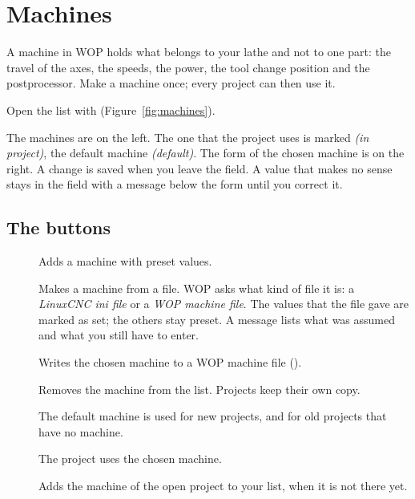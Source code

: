 \chapter{Machines}\label{ch:machines}

A machine in WOP holds what belongs to your lathe and not to one part: the travel of the axes, the speeds, the power, the tool change position and the postprocessor. Make a machine once; every project can then use it.

Open the list with  (Figure~\ref{fig:machines}).


The machines are on the left. The one that the project uses is marked \emph{(in project)}, the default machine \emph{(default)}. The form of the chosen machine is on the right. A change is saved when you leave the field. A value that makes no sense stays in the field with a message below the form until you correct it.

\section{The buttons}
\begin{description}
\item[] Adds a machine with preset values.
\item[] Makes a machine from a file. WOP asks what kind of file it is: a \emph{LinuxCNC ini file} or a \emph{WOP machine file}. The values that the file gave are marked as set; the others stay preset. A message lists what was assumed and what you still have to enter.
\item[] Writes the chosen machine to a WOP machine file ().
\item[] Removes the machine from the list. Projects keep their own copy.
\item[] The default machine is used for new projects, and for old projects that have no machine.
\item[] The project uses the chosen machine.
\item[] Adds the machine of the open project to your list, when it is not there yet.
\end{description}

